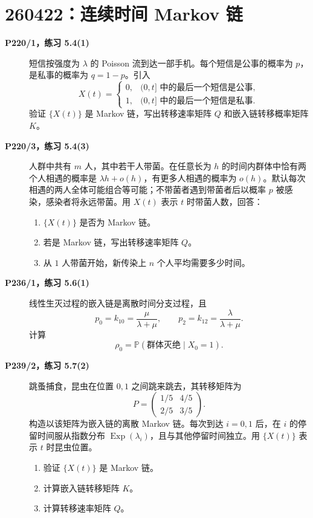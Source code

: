 \documentclass[12pt,a4paper,openany]{ctexrep}
\theoremstyle{definition}
\newcommand{\Pp}{\mathbb{P}}
\newcommand{\Exp}{\operatorname{Exp}}
\begin{document}
\section{260422：连续时间 Markov 链}

\begin{description}
	\item[\textbf{P220/1，练习 5.4(1)}] 短信按强度为 $\lambda$ 的 Poisson 流到达一部手机。每个短信是公事的概率为 $p$，是私事的概率为 $q=1-p$。引入
	\[
	X(t)=
	\begin{cases}
	0,&(0,t]\text{ 中的最后一个短信是公事},\\
	1,&(0,t]\text{ 中的最后一个短信是私事}.
	\end{cases}
	\]
	验证 $\{X(t)\}$ 是 Markov 链，写出转移速率矩阵 $Q$ 和嵌入链转移概率矩阵 $K$。
	\item[\textbf{P220/3，练习 5.4(3)}] 人群中共有 $m$ 人，其中若干人带菌。在任意长为 $h$ 的时间内群体中恰有两个人相遇的概率是 $\lambda h+o(h)$，有更多人相遇的概率为 $o(h)$。默认每次相遇的两人全体可能组合等可能；不带菌者遇到带菌者后以概率 $p$ 被感染，感染者将永远带菌。用 $X(t)$ 表示 $t$ 时带菌人数，回答：
	\begin{enumerate}[label=(\arabic*)]
		\item $\{X(t)\}$ 是否为 Markov 链。
		\item 若是 Markov 链，写出转移速率矩阵 $Q$。
		\item 从 $1$ 人带菌开始，新传染上 $n$ 个人平均需要多少时间。
	\end{enumerate}
	\item[\textbf{P236/1，练习 5.6(1)}] 线性生灭过程的嵌入链是离散时间分支过程，且
	\[
	p_0=k_{10}=\frac{\mu}{\lambda+\mu},\qquad
	p_2=k_{12}=\frac{\lambda}{\lambda+\mu}.
	\]
	计算
	\[
	\rho_0=\Pp(\text{群体灭绝}\mid X_0=1).
	\]
	\item[\textbf{P239/2，练习 5.7(2)}] 跳蚤捕食，昆虫在位置 $0,1$ 之间跳来跳去，其转移矩阵为
	\[
	P=
	\begin{pmatrix}
	1/5&4/5\\
	2/5&3/5
	\end{pmatrix}.
	\]
	构造以该矩阵为嵌入链的离散 Markov 链。每次到达 $i=0,1$ 后，在 $i$ 的停留时间服从指数分布 $\Exp(\lambda_i)$，且与其他停留时间独立。用 $\{X(t)\}$ 表示 $t$ 时昆虫位置。
	\begin{enumerate}[label=(\arabic*)]
		\item 验证 $\{X(t)\}$ 是 Markov 链。
		\item 计算嵌入链转移矩阵 $K$。
		\item 计算转移速率矩阵 $Q$。

\end{enumerate}
\end{description}
\end{document}

